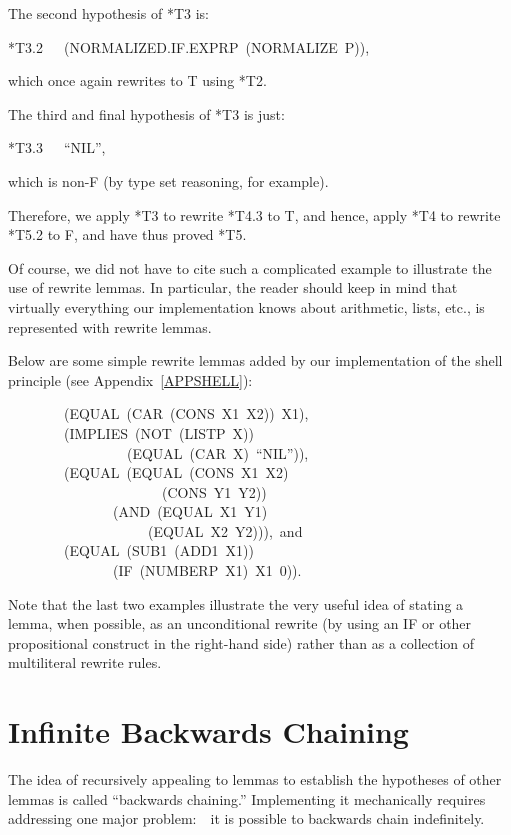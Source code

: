 \documentclass[11pt]{book}
\newenvironment{pubasis}{\begin{flushleft}\ttfamily\small}{\normalsize\rmfamily\end{flushleft}}
\newcommand{\pubdefaulttextsize}{\large}
\begin{document}
The second hypothesis of *T3 is:
\begin{pubasis}
*T3.2~~~(NOR\-MAL\-IZED.IF.EXPRP~(NOR\-MAL\-IZE~P)),\\
\end{pubasis}
which once again rewrites to T using *T2.

The third and final hypothesis of *T3 is just:
\begin{pubasis}
*T3.3~~~``NIL'',\\
\end{pubasis}
which is non-F (by type set reasoning, for example).

Therefore, we apply *T3 to rewrite *T4.3 to T, and hence,
apply *T4 to rewrite *T5.2 to F, and have thus proved *T5.

Of course, we did not have to cite such a complicated example to
illustrate the use of rewrite lemmas.  In particular, the reader
should keep in mind that virtually everything our implementation
knows about arithmetic, lists, etc., is represented with rewrite lemmas.

Below are some simple rewrite lemmas added by our implementation of
the shell principle (see Appendix~\ref{APPSHELL}):
\begin{pubasis}
~~~~~~~~(EQUAL~(CAR~(CONS~X1~X2))~X1),\\

~~~~~~~~(IMPLIES~(NOT~(LISTP~X))\\
~~~~~~~~~~~~~~~~~(EQUAL~(CAR~X)~``NIL'')),\\

~~~~~~~~(EQUAL~(EQUAL~(CONS~X1~X2)\\
~~~~~~~~~~~~~~~~~~~~~~(CONS~Y1~Y2))\\
~~~~~~~~~~~~~~~(AND~(EQUAL~X1~Y1)\\
~~~~~~~~~~~~~~~~~~~~(EQUAL~X2~Y2))),~and\\

~~~~~~~~(EQUAL~(SUB1~(ADD1~X1))\\
~~~~~~~~~~~~~~~(IF~(NUMBERP~X1)~X1~0)).\\
\end{pubasis}
Note that the last two examples illustrate the very useful  idea
of stating a lemma, when possible, as an unconditional rewrite (by using
an IF or other propositional construct in the right-hand side)
rather than as a collection of multiliteral rewrite rules.
\section{Infinite Backwards Chaining}
\pubdefaulttextsize
The idea of recursively appealing to lemmas to establish the hypotheses
of other lemmas is called ``backwards chaining.''  Implementing it mechanically
requires addressing one major problem:~~it is possible to backwards chain
indefinitely.
\end{document}
